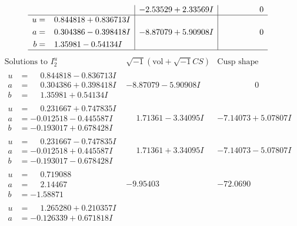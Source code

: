\documentclass[1p]{elsarticle_modified}
\theoremstyle{definition}
\newcommand{\I}{\sqrt{-1}}
\begin{document}
$$\begin{array}{c|c|c}
 & -2.53529 + 2.33569 I & \phantom{-0.000000 } 0 \\ \hline\begin{aligned}
u &= \phantom{-}0.844818 + 0.836713 I \\
a &= \phantom{-}0.304386 - 0.398418 I \\
b &= \phantom{-}1.35981 - 0.54134 I\end{aligned}
 & -8.87079 + 5.90908 I & \phantom{-0.000000 } 0\\
 \hline 
 \end{array}$$\newpage$$\begin{array}{c|c|c}  
\text{Solutions to }I^u_{2}& \I (\text{vol} + \sqrt{-1}CS) & \text{Cusp shape}\\
 \hline 
\begin{aligned}
u &= \phantom{-}0.844818 - 0.836713 I \\
a &= \phantom{-}0.304386 + 0.398418 I \\
b &= \phantom{-}1.35981 + 0.54134 I\end{aligned}
 & -8.87079 - 5.90908 I & \phantom{-0.000000 } 0 \\ \hline\begin{aligned}
u &= \phantom{-}0.231667 + 0.747835 I \\
a &= -0.012518 - 0.445587 I \\
b &= -0.193017 + 0.678428 I\end{aligned}
 & \phantom{-}1.71361 - 3.34095 I & -7.14073 + 5.07807 I \\ \hline\begin{aligned}
u &= \phantom{-}0.231667 - 0.747835 I \\
a &= -0.012518 + 0.445587 I \\
b &= -0.193017 - 0.678428 I\end{aligned}
 & \phantom{-}1.71361 + 3.34095 I & -7.14073 - 5.07807 I \\ \hline\begin{aligned}
u &= \phantom{-}0.719088\phantom{ +0.000000I} \\
a &= \phantom{-}2.14467\phantom{ +0.000000I} \\
b &= -1.58871\phantom{ +0.000000I}\end{aligned}
 & -9.95403\phantom{ +0.000000I} & -72.0690\phantom{ +0.000000I} \\ \hline\begin{aligned}
u &= \phantom{-}1.265280 + 0.210357 I \\
a &= -0.126339 + 0.671818 I \\

\end{aligned}
\end{array}$$
\end{document}
